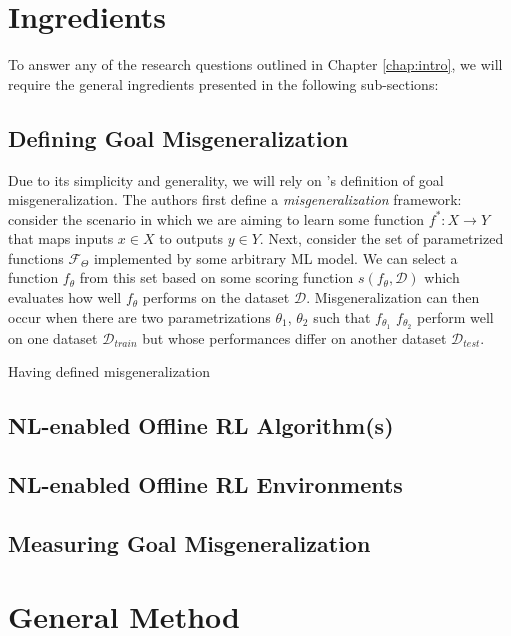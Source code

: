 \documentclass[../thesis-proposal/main.tex]{subfiles}
\begin{document}
\section{Ingredients}

To answer any of the research questions outlined in Chapter \ref{chap:intro}, we will require the
general ingredients presented in the following sub-sections:

\subsection{Defining Goal Misgeneralization}

Due to its simplicity and generality, we will rely on \citet{shah_goal_2022}'s definition of goal
misgeneralization. The authors first define a \textit{misgeneralization} framework: consider the
scenario in which we are aiming to learn some function $f^* : X \rightarrow Y$ that maps inputs $x
\in X$ to outputs $y \in Y$. Next, consider the set of parametrized functions $\mathcal{F}_\Theta$
implemented by some arbitrary ML model. We can select a function $f_\theta$ from this set based on
some scoring function $s(f_\theta, \mathcal{D})$ which evaluates how well $f_\theta$ performs on the
dataset $\mathcal{D}$. Misgeneralization can then occur when there are two parametrizations
$\theta_1$, $\theta_2$  such that $f_{\theta_1}$ $f_{\theta_2}$ perform well on one dataset
$\mathcal{D}_{train}$ but whose performances differ on another dataset $\mathcal{D}_{test}$.

Having defined misgeneralization

\subsection{NL-enabled Offline RL Algorithm(s)}

\subsection{NL-enabled Offline RL Environments}

\subsection{Measuring Goal Misgeneralization}

\section{General Method}
\end{document}
